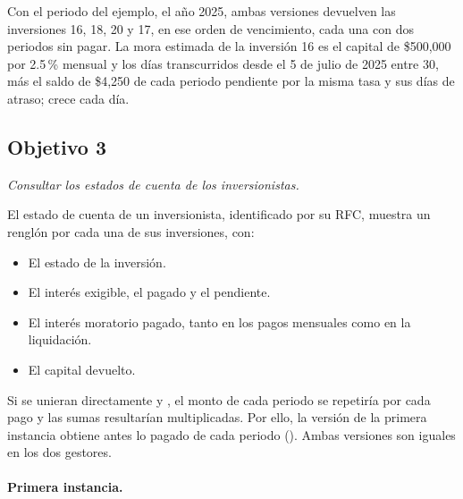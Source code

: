 Con el periodo del ejemplo, el a\~no 2025, ambas versiones devuelven las inversiones 16, 18, 20 y 17, en ese orden de vencimiento, cada una con dos periodos sin pagar. La mora estimada de la inversi\'on 16 es el capital de \$500{,}000 por 2.5\,\% mensual y los d\'ias transcurridos desde el 5 de julio de 2025 entre 30, m\'as el saldo de \$4{,}250 de cada periodo pendiente por la misma tasa y sus d\'ias de atraso; crece cada d\'ia.


\subsection{Objetivo 3}

\textit{Consultar los estados de cuenta de los inversionistas.}

El estado de cuenta de un inversionista, identificado por su RFC, muestra un rengl\'on por cada una de sus inversiones, con:

\begin{itemize}[leftmargin=*]
	\item El estado de la inversi\'on.
	\item El inter\'es exigible, el pagado y el pendiente.
	\item El inter\'es moratorio pagado, tanto en los pagos mensuales como en la liquidaci\'on.
	\item El capital devuelto.
\end{itemize}

Si se unieran directamente  y , el monto de cada periodo se repetir\'ia por cada pago y las sumas resultar\'ian multiplicadas. Por ello, la versi\'on de la primera instancia obtiene antes lo pagado de cada periodo (). Ambas versiones son iguales en los dos gestores.

\paragraph{Primera instancia.}

